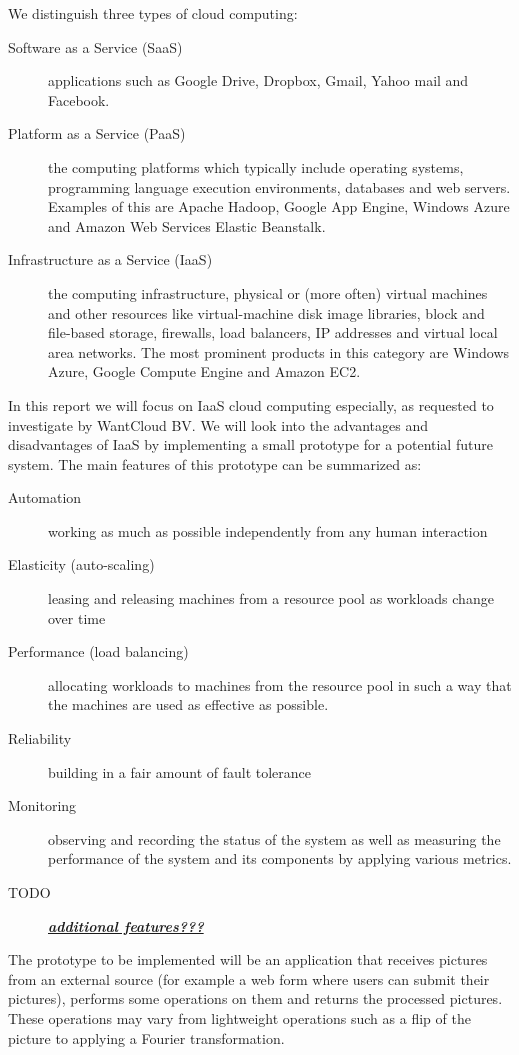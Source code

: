 \documentclass{stylesheet}
\begin{document}
We distinguish three types of cloud computing:
\begin{description}
	\item[Software as a Service (SaaS)] applications such as Google Drive, Dropbox, Gmail, Yahoo mail and Facebook.
	\item[Platform as a Service (PaaS)] the computing platforms which typically include operating systems, programming language execution environments, databases and web servers. Examples of this are Apache Hadoop, Google App Engine, Windows Azure and Amazon Web Services Elastic Beanstalk.
	\item[Infrastructure as a Service (IaaS)] the computing infrastructure, physical or (more often) virtual machines and other resources like virtual-machine disk image libraries, block and file-based storage, firewalls, load balancers, IP addresses and virtual local area networks. The most prominent products in this category are Windows Azure, Google Compute Engine and Amazon EC2.
\end{description}

In this report we will focus on IaaS cloud computing especially, as requested to investigate by WantCloud BV. We will look into the advantages and disadvantages of IaaS by implementing a small prototype for a potential future system. The main features of this prototype can be summarized as:
\begin{description}
	\item[Automation] working as much as possible independently from any human interaction
	\item[Elasticity (auto-scaling)] leasing and releasing machines from a resource pool as workloads change over time
	\item[Performance (load balancing)] allocating workloads to machines from the resource pool in such a way that the machines are used as effective as possible.
	\item[Reliability] building in a fair amount of fault tolerance
	\item[Monitoring] observing and recording the status of the system as well as measuring the performance of the system and its components by applying various metrics.
	\item[TODO] \textbf{\textit{\underline{additional features???}}}
\end{description}

The prototype to be implemented will be an application that receives pictures from an external source (for example a web form where users can submit their pictures), performs some operations on them and returns the processed pictures. These operations may vary from lightweight operations such as a flip of the picture to applying a Fourier transformation.
\end{document}
